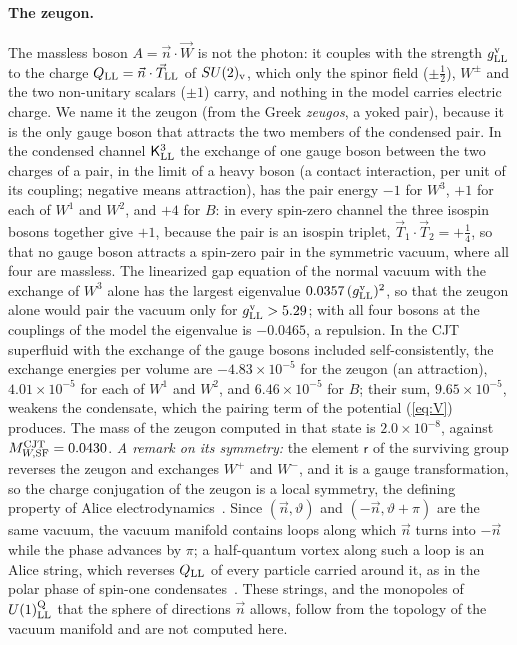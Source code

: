 \documentclass[aps,prd,onecolumn,superscriptaddress,nofootinbib,floatfix,longbibliography]{revtex4-2}
\newcommand{\LL}{{\rm LL}}
\newcommand{\SF}{{\rm SF}}
\begin{document}
\paragraph*{The zeugon.}
The massless boson $A=\vec n\cdot\vec W$ is not the photon: it couples with the strength $g^{\rm v}_\LL$ to the charge
$Q_\LL=\vec n\cdot\vec T_\LL$ of $SU(2)_{\rm v}$, which only the spinor field ($\pm\frac12$), $W^\pm$ and the two non-unitary scalars
($\pm1$) carry, and nothing in the model carries electric charge. We name it the zeugon (from the Greek \emph{zeugos}, a yoked
pair), because it is the only gauge boson that attracts the two members of the condensed pair. In the condensed channel
$\mathsf K^3_\LL$ the exchange of one gauge boson between the two charges of a pair, in the limit of a heavy boson (a contact
interaction, per unit of its coupling; negative means attraction), has the pair energy $-1$ for $W^3$, $+1$ for each of $W^1$
and $W^2$, and $+4$ for $B$: in every spin-zero channel the three isospin bosons together give $+1$, because the pair is an isospin triplet, $\vec T_1\cdot\vec T_2=+\frac14$, so that no
gauge boson attracts a spin-zero pair in the symmetric vacuum, where all four are massless. The linearized gap equation of the
normal vacuum with the exchange of $W^3$ alone has the largest eigenvalue $0.0357\,(g^{\rm v}_\LL)^2$, so that the zeugon
alone would pair the vacuum only for $g^{\rm v}_\LL>5.29$; with all four bosons at the couplings of the model the
eigenvalue is $-0.0465$, a repulsion. In the CJT superfluid with the exchange of the gauge bosons included
self-consistently, the exchange energies per volume are $-4.83\times10^{-5}$ for the zeugon (an attraction), $4.01\times10^{-5}$ for each of
$W^1$ and $W^2$, and $6.46\times10^{-5}$ for $B$; their sum, $9.65\times10^{-5}$, weakens the condensate, which the pairing term of
the potential (\ref{eq:V}) produces. The mass of the zeugon computed in that state is $2.0\times10^{-8}$, against $M^{\rm CJT}_{W,\SF}=0.0430$.
\emph{A remark on its symmetry:} the element $\mathsf r$ of the surviving group reverses the zeugon and exchanges $W^+$ and $W^-$,
and it is a gauge transformation, so the charge conjugation of the zeugon is a local symmetry, the defining property of Alice
electrodynamics~\cite{Kiskis1978,Schwarz1982,BucherLoPreskill1992}. Since $(\vec n,\vartheta)$ and $(-\vec n,\vartheta+\pi)$ are the
same vacuum, the vacuum manifold contains loops along which $\vec n$ turns into $-\vec n$ while the phase advances by $\pi$; a
half-quantum vortex along such a loop is an Alice string, which reverses $Q_\LL$ of every particle carried around it, as in the
polar phase of spin-one condensates~\cite{LeonhardtVolovik2000}. These strings, and the monopoles of $U(1)^{\rm Q}_\LL$ that the
sphere of directions $\vec n$ allows, follow from the topology of the vacuum manifold and are not computed here.
\end{document}
